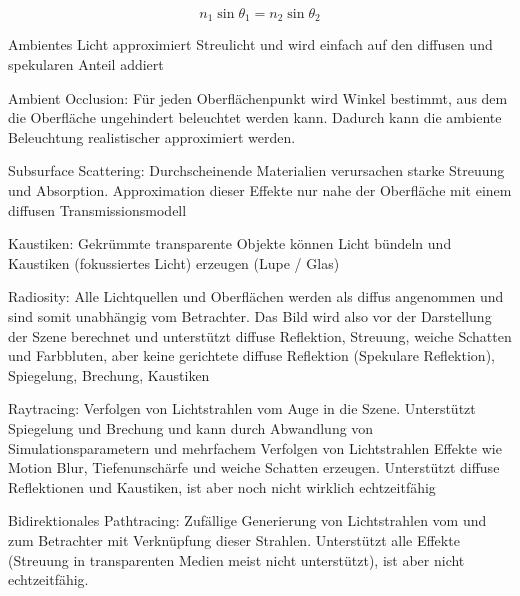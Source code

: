 \documentclass[12pt,landscape]{article}
\begin{document}
\begin{multicols}{3}
\begin{compactitem}
\[ n_1 \sin \theta_1 = n_2 \sin \theta_2 \]
\item Ambientes Licht approximiert Streulicht und wird einfach auf den diffusen und spekularen Anteil addiert
\item Ambient Occlusion: Für jeden Oberflächenpunkt wird Winkel bestimmt, aus dem die Oberfläche ungehindert beleuchtet werden kann. Dadurch kann die ambiente Beleuchtung realistischer approximiert werden.
\item Subsurface Scattering: Durchscheinende Materialien verursachen starke Streuung und Absorption. Approximation dieser Effekte nur nahe der Oberfläche mit einem diffusen Transmissionsmodell
\item Kaustiken: Gekrümmte transparente Objekte können Licht bündeln und Kaustiken (fokussiertes Licht) erzeugen (Lupe / Glas)
\item Radiosity: Alle Lichtquellen und Oberflächen werden als diffus angenommen und sind somit unabhängig vom Betrachter. Das Bild wird also vor der Darstellung der Szene berechnet und unterstützt diffuse Reflektion, Streuung, weiche Schatten und Farbbluten, aber keine gerichtete diffuse Reflektion (Spekulare Reflektion), Spiegelung, Brechung, Kaustiken
\item Raytracing: Verfolgen von Lichtstrahlen vom Auge in die Szene. Unterstützt Spiegelung und Brechung und kann durch Abwandlung von Simulationsparametern und mehrfachem Verfolgen von Lichtstrahlen Effekte wie Motion Blur, Tiefenunschärfe und weiche Schatten erzeugen. Unterstützt diffuse Reflektionen und Kaustiken, ist aber noch nicht wirklich echtzeitfähig
\item Bidirektionales Pathtracing: Zufällige Generierung von Lichtstrahlen vom und zum Betrachter mit Verknüpfung dieser Strahlen. Unterstützt alle Effekte (Streuung in transparenten Medien meist nicht unterstützt), ist aber nicht echtzeitfähig.
\end{compactitem}

\end{multicols}
\end{document}
